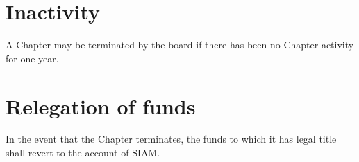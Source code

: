 \documentclass{ronr-bylaws}
\begin{document}
\section{Inactivity}
A Chapter may be terminated by the board if there has been no Chapter activity for one year.

\section{Relegation of funds}
In the event that the Chapter terminates, the funds to which it has legal title shall revert to the
account of SIAM.
\end{document}
